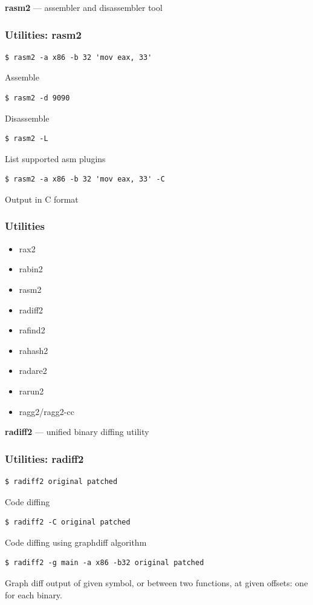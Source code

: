 \documentclass[10pt, compress]{beamer}
\begin{document}
\begin{frame}[fragile]
  \center\textbf{rasm2} — assembler and disassembler tool
  \noindent\makebox[\linewidth]{\rule{\paperwidth}{0.4pt}}
  \frametitle{Utilities: rasm2}
  \begin{verbatim}$ rasm2 -a x86 -b 32 'mov eax, 33'\end{verbatim}
  \alert{Assemble}
  \begin{verbatim}$ rasm2 -d 9090\end{verbatim}
  \alert{Disassemble}
  \begin{verbatim}$ rasm2 -L\end{verbatim}
  \alert{List supported asm plugins}
  \begin{verbatim}$ rasm2 -a x86 -b 32 'mov eax, 33' -C\end{verbatim}
  \alert{Output in C format}

\end{frame}

\begin{frame}[fragile]
  \frametitle{Utilities}
     \begin{itemize}
        \item rax2
        \item rabin2
        \item rasm2
        \item \alert{radiff2}
        \item rafind2
        \item rahash2
        \item radare2
        \item rarun2
        \item ragg2/ragg2-cc
      \end{itemize}
\end{frame}

\begin{frame}[fragile]
  \center\textbf{radiff2} — unified binary diffing utility
  \noindent\makebox[\linewidth]{\rule{\paperwidth}{0.4pt}}
  \frametitle{Utilities: radiff2}
  \begin{verbatim}$ radiff2 original patched\end{verbatim}
  \alert{Code diffing}
  \begin{verbatim}$ radiff2 -C original patched\end{verbatim}
  \alert{Code diffing using graphdiff algorithm}
  \begin{verbatim}$ radiff2 -g main -a x86 -b32 original patched\end{verbatim}
  \alert{Graph diff output of given symbol, or between two functions, at given offsets: one for each binary.}

\end{frame}
\end{document}
